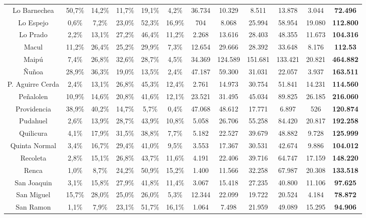 \begin{table}[htb!]
{\begin{tabular}{|c|c c c c c| c c c c c | c|}
	Lo Barnechea & 50,7\% & 14,2\% & 11,7\% & 19,1\% & 4,2\% & 36.734 & 10.329 & 8.511 & 13.878 & 3.044 & \textbf{72.496}\\
	Lo Espejo & 0,6\% & 7,2\% & 23,0\% & 52,3\% & 16,9\% & 704 & 8.068 & 25.994 & 58.954 & 19.080 & \textbf{112.800}\\
	Lo Prado & 2,2\% & 13,1\% & 27,2\% & 46,4\% & 11,2\% & 2.268 & 13.616 & 28.403 & 48.355 & 11.673 & \textbf{104.316}\\
	Macul & 11,2\% & 26,4\% & 25,2\% & 29,9\% & 7,3\% & 12.654 & 29.666 & 28.392 & 33.648 & 8.176 & \textbf{112.53}\\
	Maipú & 7,4\% & 26,8\% & 32,6\% & 28,7\% & 4,5\% & 34.369 & 124.589 & 151.681 & 133.421 & 20.821 & \textbf{464.882}\\
	Ñuñoa & 28,9\% & 36,3\% & 19,0\% & 13,5\% & 2,4\% & 47.187 & 59.300 & 31.031 & 22.057 & 3.937 & \textbf{163.511}\\
	P. Aguirre  Cerda & 2,4\% & 13,1\% & 26,8\% & 45,3\% & 12,4\% & 2.761 & 14.973 & 30.754 & 51.841 & 14.231 & \textbf{114.560}\\
	Peñalolen & 10,9\% & 14,6\% & 20,8\% & 41,6\% & 12,1\% & 23.521 & 31.495 & 45.034 & 89.825 & 26.185 & \textbf{216.060}\\
	Providencia & 38,9\% & 40,2\% & 14,7\% & 5,7\% & 0,4\% & 47.068 & 48.612 & 17.771 & 6.897 & 526 & \textbf{120.874}\\
	Pudahuel & 2,6\% & 13,9\% & 28,7\% & 43,9\% & 10,8\% & 5.058 & 26.706 & 55.258 & 84.420 & 20.817 & \textbf{192.258}\\
	Quilicura & 4,1\% & 17,9\% & 31,5\% & 38,8\% & 7,7\% & 5.182 & 22.527 & 39.679 & 48.882 & 9.728 & \textbf{125.999}\\
	Quinta Normal & 3,4\% & 16,7\% & 29,4\% & 41,0\% & 9,5\% & 3.553 & 17.367 & 30.531 & 42.674 & 9.886 & \textbf{104.012}\\
	Recoleta & 2,8\% & 15,1\% & 26,8\% & 43,7\% & 11,6\% & 4.191 & 22.406 & 39.716 & 64.747 & 17.159 & \textbf{148.220}\\
	Renca & 1,0\% & 8,7\% & 24,2\% & 50,9\% & 15,2\% & 1.400 & 11.566 & 32.258 & 67.987 & 20.308 & \textbf{133.518}\\
	San Joaquin & 3,1\% & 15,8\% & 27,9\% & 41,8\% & 11,4\% & 3.067 & 15.418 & 27.235 & 40.800 & 11.106 & \textbf{97.625}\\
	San Miguel & 15,7\% & 28,0\% & 25,0\% & 26,0\% & 5,3\% & 12.344 & 22.099 & 19.722 & 20.524 & 4.184 & \textbf{78.872}\\
	San Ramon & 1,1\% & 7,9\% & 23,1\% & 51,7\% & 16,1\% & 1.064 & 7.498 & 21.959 & 49.089 & 15.295 & \textbf{94.906}\\

\end{tabular}}
\end{table}
